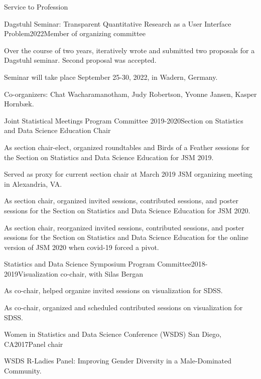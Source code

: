 \documentclass{resume} %
\begin{document}
\begin{rSection}{Service to Profession}
\begin{rSubsection}{Dagstuhl Seminar: Transparent Quantitative Research as a User Interface Problem}{}{2022}{Member of organizing committee}
\item Over the course of two years, iteratively wrote and submitted two proposals for a Dagstuhl seminar. Second proposal was accepted.
\item Seminar will take place September 25-30, 2022, in Wadern, Germany. 
\item Co-organizers: Chat Wacharamanotham, Judy Robertson, Yvonne Jansen, Kasper Hornbæk. 
\end{rSubsection}

\begin{rSubsection}{Joint Statistical Meetings Program Committee}{ }{2019-2020}{Section on Statistics and Data Science Education Chair}
\item As section chair-elect, organized roundtables and Birds of a Feather sessions for the Section on Statistics and Data Science Education for JSM 2019.
\item Served as proxy for current section chair at March 2019 JSM organizing meeting in Alexandria, VA.
\item As section chair, organized invited sessions, contributed sessions, and poster sessions for the Section on Statistics and Data Science Education for JSM 2020.
\item As section chair, reorganized invited sessions, contributed sessions, and poster sessions for the Section on Statistics and Data Science Education for the online version of JSM 2020 when covid-19 forced a pivot.
\end{rSubsection}

\begin{rSubsection}{Statistics and Data Science Symposium Program Committee}{}{2018-2019}{Visualization co-chair, with Silas Bergan}
\item As co-chair, helped organize invited sessions on visualization for SDSS.
\item As co-chair, organized and scheduled contributed sessions on visualization for SDSS.
\end{rSubsection}

\begin{rSubsection}{Women in Statistics and Data Science Conference (WSDS)}{ San Diego, CA}{2017}{Panel chair}
\item WSDS R-Ladies Panel: Improving Gender Diversity in a Male-Dominated Community.
\end{rSubsection}


\end{rSection}
\end{document}
